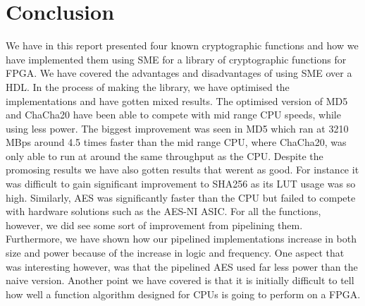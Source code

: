 \documentclass[a4paper, openany]{book}
\begin{document}
\chapter{Conclusion}
\label{sec:org4dbde5f}
We have in this report presented four known cryptographic functions and how we have implemented them using SME
for a library of cryptographic functions for FPGA. We have covered the advantages and disadvantages of using SME over a HDL.
In the process of making the library, we have optimised the implementations and have gotten mixed results.
The optimised version of MD5 and ChaCha20 have been able to compete with mid range CPU speeds, while using less power.
The biggest improvement was seen in MD5 which ran at 3210 MBps around 4.5 times faster than the mid range CPU, where ChaCha20,
was only able to run at around the same throughput as the CPU. Despite the promosing results we have also gotten results that werent as good.
For instance it was difficult to gain significant improvement to SHA256 as its LUT usage was so high.
Similarly, AES was significantly faster than the CPU but failed to compete with hardware solutions such as the AES-NI ASIC.
For all the functions, however, we did see some sort of improvement from pipelining them.
Furthermore, we have shown how our pipelined implementations increase in both size and power because of the increase in logic and frequency.
One aspect that was interesting however, was that the pipelined AES used far less power than the naive version.
Another point we have covered is that it is initially difficult to tell how well a function algorithm designed for CPUs is going to perform on a FPGA.



\end{document}
